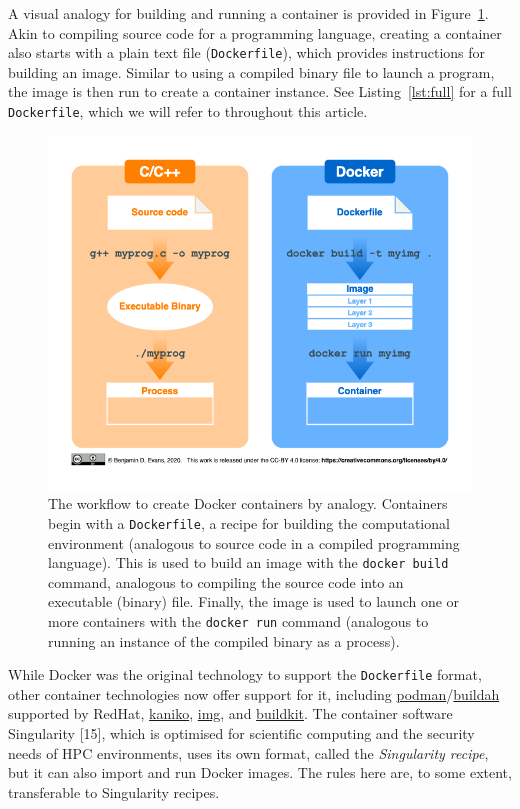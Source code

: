 \documentclass[10pt,letterpaper]{article}
\begin{document}
A visual analogy for building and running a container is provided in
Figure~\ref{fig:analogy}. Akin to compiling source code for a
programming language, creating a container also starts with a plain text
file (\texttt{Dockerfile}), which provides instructions for building an
image. Similar to using a compiled binary file to launch a program, the
image is then run to create a container instance. See
Listing~\ref{lst:full} for a full \texttt{Dockerfile}, which we will
refer to throughout this article.

\begin{figure}[h]

{\centering \includegraphics[width=1\linewidth]{analogy} 

}

\caption{The workflow to create Docker containers by analogy. Containers begin with a \texttt{Dockerfile}, a recipe for building the computational environment (analogous to source code in a compiled programming language). This is used to build an image with the \texttt{docker build} command, analogous to compiling the source code into an executable (binary) file. Finally, the image is used to launch one or more containers with the \texttt{docker run} command (analogous to running an instance of the compiled binary as a process).}\label{fig:analogy}
\end{figure}

While Docker was the original technology to support the
\texttt{Dockerfile} format, other container technologies now offer
support for it, including
\href{https://podman.io/}{podman}/\href{https://github.com/containers/buildah}{buildah}
supported by RedHat,
\href{https://github.com/GoogleContainerTools/kaniko}{kaniko},
\href{https://github.com/genuinetools/img}{img}, and
\href{https://github.com/moby/buildkit}{buildkit}. The container
software Singularity {[}15{]}, which is optimised for scientific
computing and the security needs of HPC environments, uses its own
format, called the \emph{Singularity recipe}, but it can also import and
run Docker images. The rules here are, to some extent, transferable to
Singularity recipes.
\end{document}
